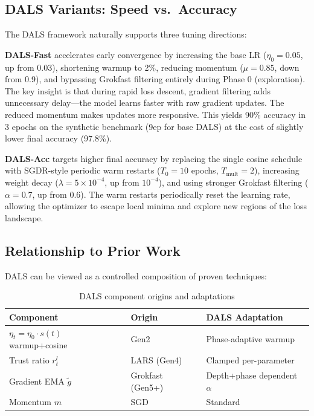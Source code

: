 \documentclass[a4paper,fleqn]{cas-dc}
\begin{document}
\subsection{DALS Variants: Speed vs.\ Accuracy}

The DALS framework naturally supports three tuning directions:

\textbf{DALS-Fast} accelerates early convergence by increasing the base LR ($\eta_0 = 0.05$, up from 0.03), shortening warmup to 2\%, reducing momentum ($\mu = 0.85$, down from 0.9), and bypassing Grokfast filtering entirely during Phase 0 (exploration). The key insight is that during rapid loss descent, gradient filtering adds unnecessary delay---the model learns faster with raw gradient updates. The reduced momentum makes updates more responsive. This yields 90\% accuracy in 3 epochs on the synthetic benchmark (9ep for base DALS) at the cost of slightly lower final accuracy (97.8\%).

\textbf{DALS-Acc} targets higher final accuracy by replacing the single cosine schedule with SGDR-style periodic warm restarts ($T_0 = 10$ epochs, $T_{\text{mult}} = 2$), increasing weight decay ($\lambda = 5 \times 10^{-4}$, up from $10^{-4}$), and using stronger Grokfast filtering ($\alpha = 0.7$, up from 0.6). The warm restarts periodically reset the learning rate, allowing the optimizer to escape local minima and explore new regions of the loss landscape.

\subsection{Relationship to Prior Work}

DALS can be viewed as a controlled composition of proven techniques:

\begin{table}[width=.6\textwidth,cols=3,pos=h]
\caption{DALS component origins and adaptations}\label{tab:dals_components}
\begin{tabular*}{\tblwidth}{@{} LLL @{}}
\toprule
Component & Origin & DALS Adaptation \\
\midrule
$\eta_t = \eta_0 \cdot s(t)$ warmup+cosine & Gen2 & Phase-adaptive warmup \\
Trust ratio $r_t^l$ & LARS (Gen4) & Clamped per-parameter \\
Gradient EMA $\tilde{g}$ & Grokfast (Gen5+) & Depth+phase dependent $\alpha$ \\
Momentum $m$ & SGD & Standard \\
\bottomrule
\end{tabular*}
\end{table}
\end{document}

